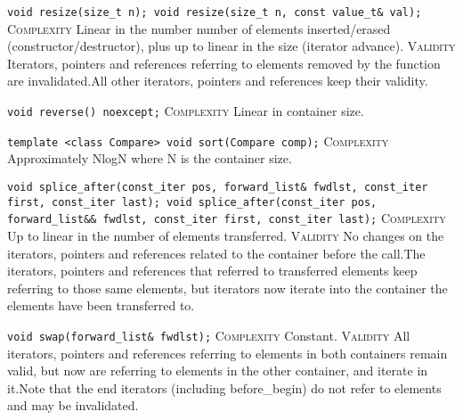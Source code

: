 \noindent{}\hspace*{0.25em}\lstinline[basicstyle=\ttfamily\color{corange}]{void resize(size_t n); void resize(size_t n, const value_t& val);} \textsc{Complexity} Linear in the number number of elements inserted/erased (constructor/destructor), plus up to linear in the size (iterator advance). \textsc{Validity} Iterators, pointers and references referring to elements removed by the function are invalidated.All other iterators, pointers and references keep their validity.\\\vspace{-0.6em}

\noindent{}\hspace*{0.25em}\lstinline[basicstyle=\ttfamily\color{corange}]{void reverse() noexcept;} \textsc{Complexity} Linear in container size.\\\vspace{-0.6em}

\noindent{}\hspace*{0.25em}\lstinline[basicstyle=\ttfamily\color{cred}]{template <class Compare> void sort(Compare comp);} \textsc{Complexity} Approximately NlogN where N is the container size.\\\vspace{-0.6em}

\noindent{}\hspace*{0.25em}\lstinline[basicstyle=\ttfamily\color{corange}]{void splice_after(const_iter pos, forward_list& fwdlst, const_iter first, const_iter last); void splice_after(const_iter pos, forward_list&& fwdlst, const_iter first, const_iter last);} \textsc{Complexity} Up to linear in the number of elements transferred. \textsc{Validity} No changes on the iterators, pointers and references related to the container before the call.The iterators, pointers and references that referred to transferred elements keep referring to those same elements, but iterators now iterate into the container the elements have been transferred to.\\\vspace{-0.6em}

\noindent{}\hspace*{0.25em}\lstinline[basicstyle=\ttfamily\color{cgreen}]{void swap(forward_list& fwdlst);} \textsc{Complexity} Constant. \textsc{Validity} All iterators, pointers and references referring to elements in both containers remain valid, but now are referring to elements in the other container, and iterate in it.Note that the end iterators (including before\_begin) do not refer to elements and may be invalidated.\\\vspace{-0.6em}


